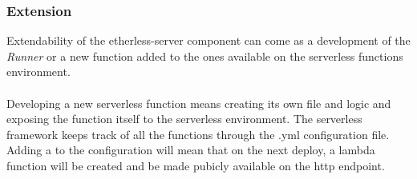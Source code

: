 \subsubsection{Extension}
Extendability of the etherless-server component can come as a development of the \textit{Runner} or a new function added to the ones available on the serverless functions environment.\\\\Developing a new serverless function means creating its own file and logic and exposing the function itself to the serverless environment. The serverless framework keeps track of all the functions through the .yml configuration file. Adding a to the configuration will mean that on the next deploy, a lambda function will be created and be made pubicly available on the http endpoint.
